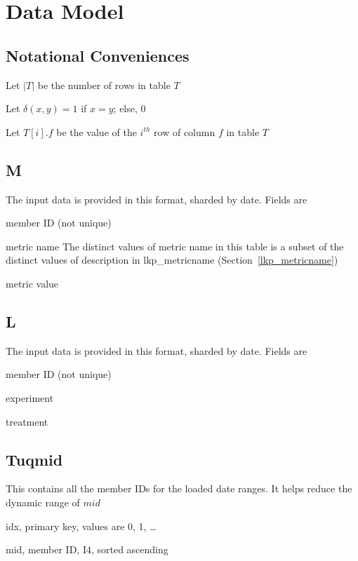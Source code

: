 \section{Data Model}

\subsection{Notational Conveniences}

\begin{definition}
Let \(|T|\) be the number of rows in table \(T\)
\end{definition}

\begin{definition}
Let \(\delta(x, y) = 1 \) if \(x = y\); else, 0
\end{definition}

\begin{definition}
Let \(T[i].f\) be the value of the \(i^{th}\) row of column \(f\) in
table \(T\)
\end{definition}


\subsection{M}
\label{M}
The input data is provided in this format, sharded by date. Fields are 
\be
\item member ID (not unique)
\item metric name
The distinct values of metric name in this table is a subset of the
distinct values of description in lkp\_metricname
(Section~\ref{lkp_metricname})
\item metric value
\ee

\subsection{L}
\label{L}
The input data is provided in this format, sharded by date. Fields are 
\be
\item member ID (not unique)
\item experiment
\item treatment 
\ee

\subsection{Tuqmid}
\label{Tuqmid}

This contains all the member IDs for the loaded date ranges. It helps
reduce the dynamic range of \(mid\)
\be
\item idx, primary key, values are 0, 1, \ldots
\item mid, member ID, I4, sorted ascending
\ee

